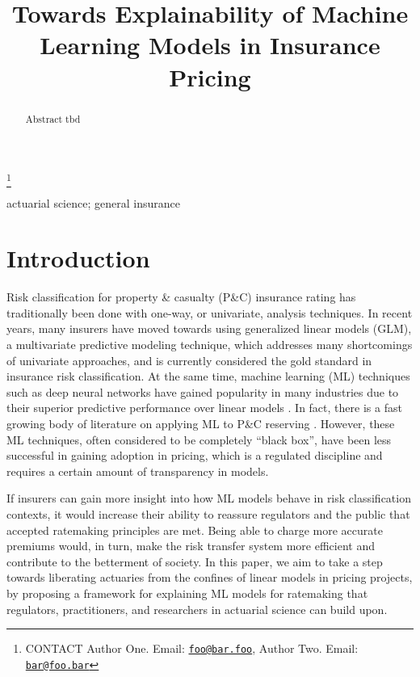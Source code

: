 \documentclass[]{interact}
\theoremstyle{plain}%
\theoremstyle{definition}
\theoremstyle{remark}
\begin{document}

\title{Towards Explainability of Machine Learning Models in Insurance Pricing}


\author{
}

\thanks{CONTACT Author One. Email: \href{mailto:foo@bar.foo}{\nolinkurl{foo@bar.foo}}, Author Two. Email: \href{mailto:bar@foo.bar}{\nolinkurl{bar@foo.bar}}}

\maketitle

\begin{abstract}
Abstract tbd
\end{abstract}

\begin{keywords}
actuarial science; general insurance
\end{keywords}

\section{Introduction}\label{introduction}

Risk classification for property \& casualty (P\&C) insurance rating has
traditionally been done with one-way, or univariate, analysis
techniques. In recent years, many insurers have moved towards using
generalized linear models (GLM), a multivariate predictive modeling
technique, which addresses many shortcomings of univariate approaches,
and is currently considered the gold standard in insurance risk
classification. At the same time, machine learning (ML) techniques such
as deep neural networks have gained popularity in many industries due to
their superior predictive performance over linear models
\citep{lecunDeepLearning2015}. In fact, there is a fast growing body of
literature on applying ML to P\&C reserving
\citep{kuoDeepTriangleDeep2018, wuthrichMachineLearning2018, gabrielliNeuralNetwork2019a, gabrielliNeuralNetwork2019}.
However, these ML techniques, often considered to be completely ``black
box'', have been less successful in gaining adoption in pricing, which
is a regulated discipline and requires a certain amount of transparency
in models.

If insurers can gain more insight into how ML models behave in risk
classification contexts, it would increase their ability to reassure
regulators and the public that accepted ratemaking principles are met.
Being able to charge more accurate premiums would, in turn, make the
risk transfer system more efficient and contribute to the betterment of
society. In this paper, we aim to take a step towards liberating
actuaries from the confines of linear models in pricing projects, by
proposing a framework for explaining ML models for ratemaking that
regulators, practitioners, and researchers in actuarial science can
build upon.
\end{document}
